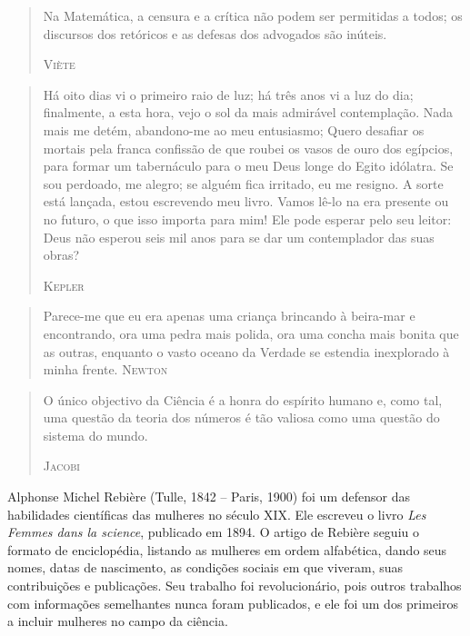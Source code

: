 \documentclass{hipatia}
\begin{document}
\begin{quote}
Na Matemática, a censura e a crítica não podem ser permitidas a todos; os discursos dos retóricos e as defesas dos advogados são inúteis.

\hfill \textsc{Viète}
\end{quote}
 
\begin{quote}
Há oito dias vi o primeiro raio de luz; há três anos vi a luz do dia; finalmente, a esta hora, vejo o sol da mais admirável contemplação. Nada mais me detém, abandono-me ao meu entusiasmo; Quero desafiar os mortais pela franca confissão de que roubei os vasos de ouro dos egípcios, para formar um tabernáculo para o meu Deus longe do Egito idólatra. Se sou perdoado, me alegro; se alguém fica irritado, eu me resigno. A sorte está lançada, estou escrevendo meu livro. Vamos lê-lo na era presente ou no futuro, o que isso importa para mim! Ele pode esperar pelo seu leitor: Deus não esperou seis mil anos para se dar um contemplador das suas obras?

\hfill \textsc{Kepler}
\end{quote}

\begin{quote}
Parece-me que eu era apenas uma criança brincando à beira-mar e encontrando, ora uma pedra mais polida, ora uma concha mais bonita que as outras, enquanto o vasto oceano da Verdade se estendia inexplorado à minha frente.
\hfill \textsc{Newton}
\end{quote}

 
\begin{quote} 
O único objectivo da Ciência é a honra do espírito humano e, como tal, uma questão da teoria dos números é tão valiosa como uma questão do sistema do mundo.

\hfill \textsc{Jacobi}
\end{quote}

 


\vfill

Alphonse Michel Rebière (Tulle, 1842 -- Paris, 1900) foi um defensor das habilidades científicas das mulheres no século XIX. Ele escreveu o livro \emph{Les Femmes dans la science}, publicado em 1894. O artigo de Rebière seguiu o formato de enciclopédia, listando as mulheres em ordem alfabética, dando seus nomes, datas de nascimento, as condições sociais em que viveram, suas contribuições e publicações. Seu trabalho foi revolucionário, pois outros trabalhos com informações semelhantes nunca foram publicados, e ele foi um dos primeiros a incluir mulheres no campo da ciência.
\end{document}

